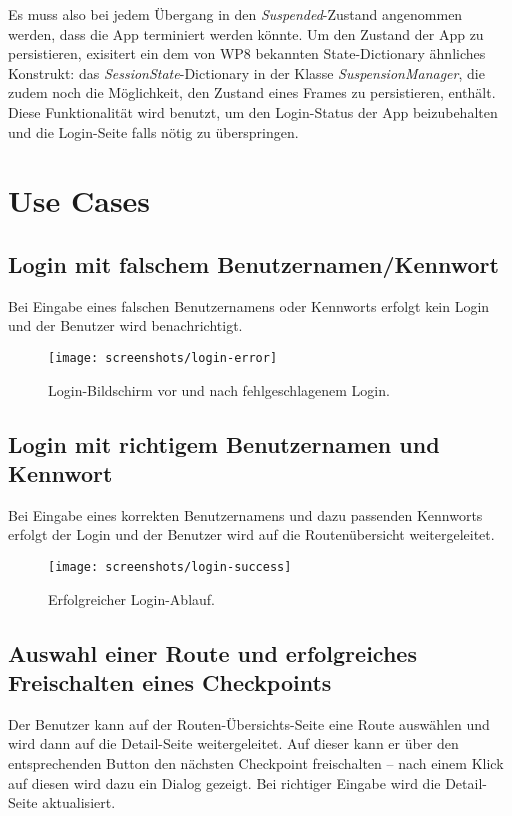 \documentclass[a4paper,ngerman]{scrartcl}
\begin{document}
Es muss also bei jedem Übergang in den \textit{Suspended}-Zustand angenommen werden, dass die App terminiert werden könnte. Um den Zustand der App zu persistieren, exisitert ein dem von WP8 bekannten State-Dictionary ähnliches Konstrukt: das \textit{SessionState}-Dictionary in der Klasse \textit{SuspensionManager}, die zudem noch die Möglichkeit, den Zustand eines Frames zu persistieren, enthält. Diese Funktionalität wird benutzt, um den Login-Status der App beizubehalten und die Login-Seite falls nötig zu überspringen.


\newpage
\section{Use Cases}
\subsection{Login mit falschem Benutzernamen/Kennwort}
Bei Eingabe eines falschen Benutzernamens oder Kennworts erfolgt kein Login und der Benutzer wird benachrichtigt.

\begin{figure}[h]
\centering
\texttt{[image: screenshots/login-error]}
\caption{Login-Bildschirm vor und nach fehlgeschlagenem Login.}
\label{fig:GraphDb}
\end{figure}

\newpage
\subsection{Login mit richtigem Benutzernamen und Kennwort}
Bei Eingabe eines korrekten Benutzernamens und dazu passenden Kennworts erfolgt der Login und der Benutzer wird auf die Routenübersicht weitergeleitet.


\begin{figure}[h]
\centering
\texttt{[image: screenshots/login-success]}
\caption{Erfolgreicher Login-Ablauf.}
\label{fig:GraphDb}
\end{figure}

\newpage
\subsection{Auswahl einer Route und erfolgreiches Freischalten eines Checkpoints}
Der Benutzer kann auf der Routen-Übersichts-Seite eine Route auswählen und wird dann auf die Detail-Seite weitergeleitet. Auf dieser kann er über den entsprechenden Button den nächsten Checkpoint freischalten -- nach einem Klick auf diesen wird dazu ein Dialog gezeigt. Bei richtiger Eingabe wird die Detail-Seite aktualisiert.
\end{document}
